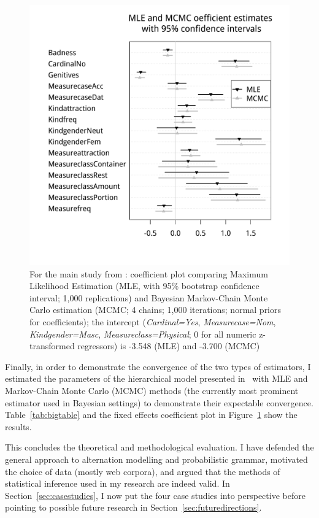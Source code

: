 \begin{figure}[htpb]
  \centering
  \includegraphics[width=\textwidth]{graphics/corpus_fixeffs_mle+mcmc}
  \caption{For the main study from \ROMeasure: coefficient plot comparing Maximum Likelihood Estimation (MLE, with 95\% bootstrap confidence interval; 1,000 replications) and Bayesian Markov-Chain Monte Carlo estimation (MCMC; 4 chains; 1,000 iterations; normal priors for coefficients); the intercept (\textit{Cardinal=Yes}, \textit{Measurecase=Nom}, \textit{Kindgender=Masc}, \textit{Measureclass=Physical}; 0 for all numeric z-transformed regressors) is -3.548 (MLE) and -3.700 (MCMC)}
  \label{fig:fixeffs}
\end{figure}

Finally, in order to demonstrate the convergence of the two types of estimators, I estimated the parameters of the hierarchical model presented in \ROMeasure\ with MLE and Markov-Chain Monte Carlo (MCMC) methods (the currently most prominent estimator used in Bayesian settings) to demonstrate their expectable convergence.
Table~\ref{tab:bigtable} and the fixed effects coefficient plot in Figure~\ref{fig:fixeffs} show the results.

This concludes the theoretical and methodological evaluation.
I have defended the general approach to alternation modelling and probabilistic grammar, motivated the choice of data (mostly web corpora), and argued that the methods of statistical inference used in my research are indeed valid.
In Section~\ref{sec:casestudies}, I now put the four case studies into perspective before pointing to possible future research in Section~\ref{sec:futuredirections}.
